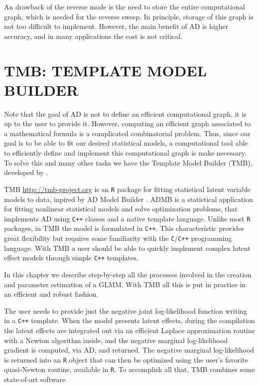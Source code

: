 An drawback of the reverse mode is the need to store the entire
computational graph, which is needed for the reverse sweep. In
principle, storage of this graph is not too difficult to implement.
However, the main benefit of AD is higher accuracy, and in many
applications the cost is not critical.

\section{TMB: TEMPLATE MODEL BUILDER}
\label{cap:tmb}

Note that the goal of AD is not to define an efficient computational
graph, it is up to the user to provide it. However, computing an
efficient graph associated to a mathematical formula is a complicated
combinatorial problem. Thus, since our goal is to be able to fit our
desired statistical models, a computational tool able to efficiently
define and implement this computational graph is make necessary. To
solve this and many other tasks we have the Template Model Builder
(TMB), developed by .

TMB \url{ http://tmb-project.org} is an \texttt{R} \cite{R18} package
for fitting statistical latent variable models to data, inpired by AD
Model Builder \cite[ADMB]{ADMB}. ADMB is a statistical application for
fitting nonlinear statistical models and solve optimization problems,
that implements AD using \texttt{C++} classes and a native template
language. Unlike most \texttt{R} packages, in TMB the model is
formulated in \texttt{C++}. This characteristic provides great
flexibility but requires some familiarity with the
\texttt{C}/\texttt{C++} programming language. With TMB a user should be
able to quickly implement complex latent effect models through simple
\texttt{C++} templates.

In this chapter we describe step-by-step all the processes involved in
the creation and parameter estimation of a GLMM. With TMB all this is
put in practice in an efficient and robust fashion.

The user needs to provide just the negative joint log-likelihood
function writing in a \texttt{C++} template. When the model presents
latent effects, during the compilation the latent effects are integrated
out via an efficient Laplace approximation routine with a Newton
algorithm inside, and the negative marginal log-likelihood gradient is
computed, via AD, and returned. The negative marginal log-likelihood is
returned into an \texttt{R} object that can then be optimized using the
user's favorite quasi-Newton routine, available in \texttt{R}. To
accomplish all that, TMB combines some state-of-art software

